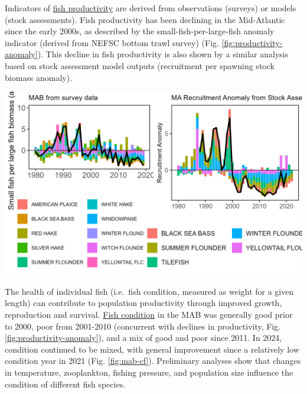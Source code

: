 \documentclass[
  10pt,
]{article}
\let\origfigure\figure
\let\endorigfigure\endfigure
\renewenvironment{figure}[1][2] {
    \expandafter\origfigure\expandafter[H]
} {
    \endorigfigure
}
\begin{document}
Indicators of \href{https://noaa-edab.github.io/catalog/productivity_anomaly.html}{fish productivity} are derived from observations (surveys) or models (stock assessments). Fish productivity has been declining in the Mid-Atlantic since the early 2000s, as described by the small-fish-per-large-fish anomaly indicator (derived from NEFSC bottom trawl survey) (Fig. \ref{fig:productivity-anomaly}). This decline in fish productivity is also shown by a similar analysis based on stock assessment model outputs (recruitment per spawning stock biomass anomaly).

\begin{figure}

{\centering \includegraphics[width=6.5in]{images/MidAtlantic/productivity_anomaly_MidAtlantic_2025-09-05} 

}

\caption{Fish productivity measures. Left: Small fish per large fish survey biomass anomaly in the Mid-Atlantic Bight. Right: assessment recruitment per spawning stock biomass anomaly for stocks mainly in the Mid-Atlantic. The summed anomaly across species is shown by the black line, drawn across all years with the same number of stocks analyzed.}\label{fig:productivity-anomaly}
\end{figure}

The health of individual fish (i.e.~fish condition, measured as weight for a given length) can contribute to population productivity through improved growth, reproduction and survival. \href{https://noaa-edab.github.io/catalog/condition.html}{Fish condition} in the MAB was generally good prior to 2000, poor from 2001-2010 (concurrent with declines in productivity, Fig. \ref{fig:productivity-anomaly}), and a mix of good and poor since 2011. In 2024, condition continued to be mixed, with general improvement since a relatively low condition year in 2021 (Fig. \ref{fig:mab-cf}). Preliminary analyses show that changes in temperature, zooplankton, fishing pressure, and population size influence the condition of different fish species.
\end{document}
